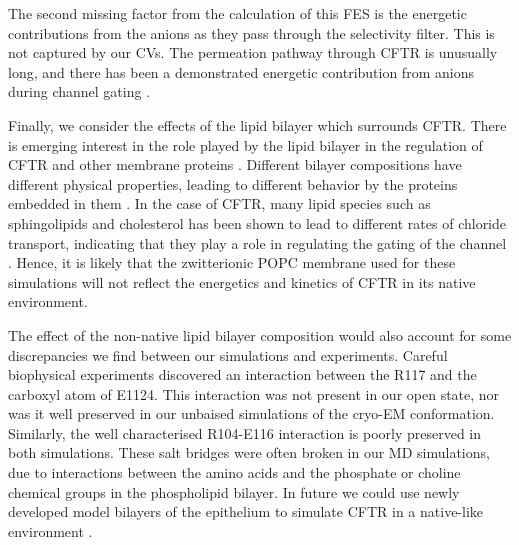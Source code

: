 The second missing factor from the calculation of this FES is the energetic contributions from the anions as they pass through the selectivity filter. This is not captured by our CVs. The permeation pathway through CFTR is unusually long, and there has been a demonstrated energetic contribution from anions during channel gating \cite{gong2004, gong2003, gong2003a, tabcharani1993, zhou2002, sorum2015, yeh2015}. 

Finally, we consider the effects of the lipid bilayer which surrounds CFTR. There is emerging interest in the role played by the lipid bilayer in the regulation of CFTR and other membrane proteins \cite{cottrill2020, lin2022, kapoor2021, farinha2018, cui2020}. Different bilayer compositions have different physical properties, leading to different behavior by the proteins embedded in them \cite{hickey2011}. In the case of CFTR, many lipid species such as sphingolipids and cholesterol has been shown to lead to different rates of chloride transport, indicating that they play a role in regulating the gating of the channel \cite{aureli2016, farinha2018, cottrill2020}. Hence, it is likely that the zwitterionic POPC membrane used for these simulations will not reflect the energetics and kinetics of CFTR in its native environment.

The effect of the non-native lipid bilayer composition would also account for some discrepancies we find between our simulations and experiments. Careful biophysical experiments discovered an interaction between the R117 and the carboxyl atom of E1124. This interaction was not present in our open state, nor was it well preserved in our unbaised simulations of the cryo-EM conformation. Similarly, the well characterised R104-E116 interaction is poorly preserved in both simulations. These salt bridges were often broken in our MD simulations, due to interactions between the amino acids and the phosphate or choline chemical groups in the phospholipid bilayer. In future we could use newly developed model bilayers of the epithelium to simulate CFTR in a native-like environment \cite{wilson2021}.


